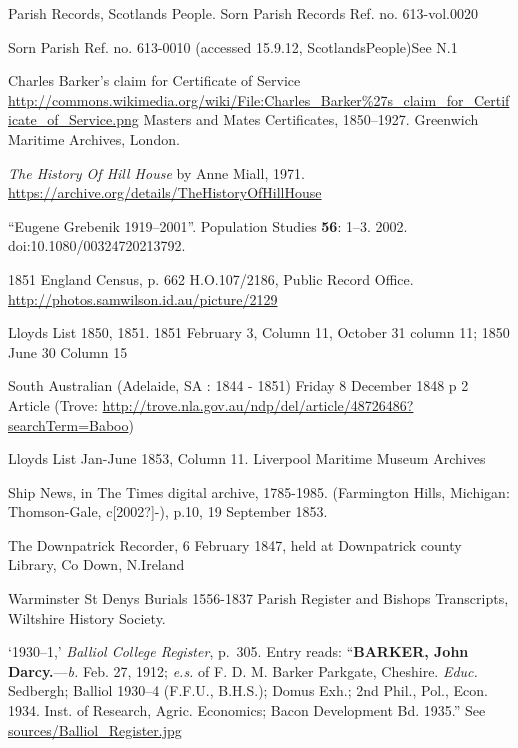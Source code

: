 \begin{thebibliography}{99}
	Parish Records, Scotlands People. Sorn Parish Records Ref. no. 613-vol.0020

	Sorn Parish Ref. no. 613-0010 (accessed 15.9.12, ScotlandsPeople)See N.1

	Charles Barker's claim for Certificate of Service
	\url{http://commons.wikimedia.org/wiki/File:Charles_Barker\%27s_claim_for_Certificate_of_Service.png}
	Masters and Mates Certificates, 1850--1927. Greenwich Maritime Archives, London.

	\emph{The History Of Hill House} by Anne Miall, 1971.
	\url{https://archive.org/details/TheHistoryOfHillHouse}

``Eugene Grebenik 1919--2001''. Population Studies \textbf{56}: 1--3. 2002. doi:10.1080/00324720213792.

	1851 England Census, p. 662 H.O.107/2186, Public Record Office.
	\url{http://photos.samwilson.id.au/picture/2129}

	Lloyds List 1850, 1851. 1851 February 3, Column 11, October 31 column 11; 1850 June 30 Column 15

	South Australian (Adelaide, SA : 1844 - 1851) Friday 8 December 1848 p 2 Article
	(Trove: \url{http://trove.nla.gov.au/ndp/del/article/48726486?searchTerm=Baboo})

	Lloyds List Jan-June 1853, Column 11.  Liverpool Maritime Museum Archives

	Ship News, in The Times digital archive, 1785-1985. (Farmington Hills, Michigan: Thomson-Gale, c[2002?]-), 	p.10, 19 September 1853.

	The Downpatrick Recorder, 6 February 1847, held at Downpatrick county Library, Co Down, N.Ireland

	Warminster St Denys Burials 1556-1837 Parish Register and Bishops Transcripts, Wiltshire History Society.

	`1930--1,' \emph{Balliol College Register}, p.~305. Entry reads:
	``\textbf{BARKER, John Darcy.}---\emph{b.} Feb. 27, 1912; \emph{e.s.} of F. D. M. Barker Parkgate, Cheshire. \emph{Educ.} Sedbergh; Balliol 1930--4 (F.F.U., B.H.S.); Domus Exh.; 2nd Phil., Pol., Econ. 1934. Inst. of Research, Agric. Economics; Bacon Development Bd. 1935.''
	See \url{sources/Balliol_Register.jpg}


\end{thebibliography}

